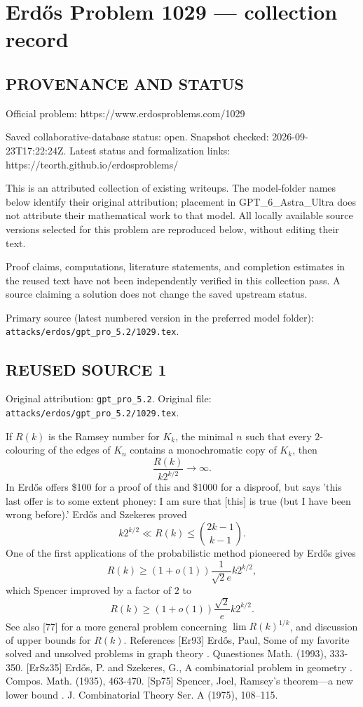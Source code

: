 \section*{Erd\H{o}s Problem 1029 --- collection record}

\subsection*{PROVENANCE AND STATUS}
Official problem: https://www.erdosproblems.com/1029

Saved collaborative-database status: open.
Snapshot checked: 2026-09-23T17:22:24Z.
Latest status and formalization links: https://teorth.github.io/erdosproblems/

This is an attributed collection of existing writeups. The model-folder names below identify their original attribution; placement in GPT\_6\_Astra\_Ultra does not attribute their mathematical work to that model. All locally available source versions selected for this problem are reproduced below, without editing their text.

Proof claims, computations, literature statements, and completion estimates in the reused text have not been independently verified in this collection pass. A source claiming a solution does not change the saved upstream status.

Primary source (latest numbered version in the preferred model folder): \texttt{attacks/erdos/gpt\_pro\_5.2/1029.tex}.

\subsection*{REUSED SOURCE 1}
Original attribution: \texttt{gpt\_pro\_5.2}.
Original file: \texttt{attacks/erdos/gpt\_pro\_5.2/1029.tex}.


If $R(k)$ is the Ramsey number for $K_k$, the minimal $n$ such that every $2$-colouring of the edges of $K_n$ contains a monochromatic copy of $K_k$, then\[\frac{R(k)}{k2^{k/2}}\to \infty.\] In \cite{Er93} Erd\H{o}s offers \$100 for a proof of this and \$1000 for a disproof, but says 'this last offer is to some extent phoney: I am sure that [this] is true (but I have been wrong before).' Erd\H{o}s and Szekeres \cite{ErSz35} proved\[k2^{k/2} \ll R(k) \leq \binom{2k-1}{k-1}.\]One of the first applications of the probabilistic method pioneered by Erd\H{o}s gives\[R(k) \geq (1+o(1))\frac{1}{\sqrt{2}e}k2^{k/2},\]which Spencer \cite{Sp75} improved by a factor of $2$ to\[R(k) \geq (1+o(1))\frac{\sqrt{2}}{e}k2^{k/2}.\]See also [77] for a more general problem concerning $\lim R(k)^{1/k}$, and discussion of upper bounds for $R(k)$. References [Er93] Erd\H{o}s, Paul, Some of my favorite solved and unsolved problems in graph theory . Quaestiones Math. (1993), 333-350. [ErSz35] Erd\H{o}s, P. and Szekeres, G., A combinatorial problem in geometry . Compos. Math. (1935), 463-470. [Sp75] Spencer, Joel, Ramsey's theorem---a new lower bound . J. Combinatorial Theory Ser. A (1975), 108--115.

